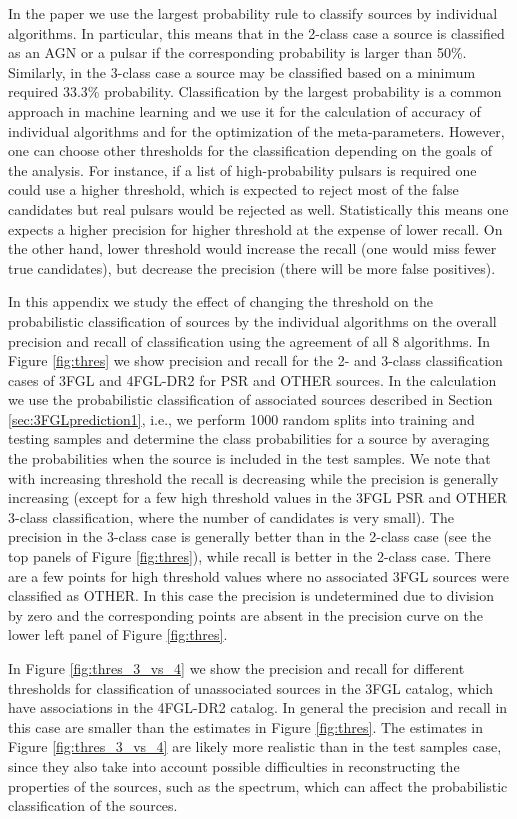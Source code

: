 In the paper we use the largest probability rule to classify sources by individual algorithms.
In particular, this means that in the 2-class case a source is classified as an AGN or a pulsar if the corresponding probability
is larger than 50\%. Similarly, in the 3-class case a source may be classified based on a minimum required 33.3\% probability.
Classification by the largest probability is a common approach in machine learning and we use it
for the calculation of accuracy of individual algorithms and for the optimization of the meta-parameters. 
However, one can choose other thresholds for the classification depending on the goals of the analysis.
For instance, if a list of high-probability pulsars is required one could use a higher threshold, 
which is expected to reject most of the false candidates but real pulsars would be rejected as well. 
Statistically this means one expects a higher precision for higher threshold
at the expense of lower recall.
On the other hand, lower threshold would increase the recall (one would miss fewer true candidates), 
but decrease the precision (there will be more false positives).



In this appendix we study the effect of changing the threshold on the probabilistic classification of sources by the individual
algorithms on the overall precision and recall of classification using the agreement of all 8 algorithms.
In Figure \ref{fig:thres} we show precision and recall for the 2- and 3-class classification cases of 3FGL and 4FGL-DR2 for PSR and OTHER sources.
In the calculation we use the probabilistic classification of associated sources described in Section \ref{sec:3FGLprediction1},
i.e., we perform 1000 random splits into training and testing samples and determine the class probabilities for a source by averaging the probabilities when the source is included in the test samples.
We note that with increasing threshold the recall is decreasing while the precision is generally increasing  (except for a few high threshold values in the 3FGL PSR and OTHER 3-class classification, where the number of candidates is very small).
The precision in the 3-class case is generally better than in the 2-class case (see the top panels of Figure \ref{fig:thres}),
while recall is better in the 2-class case.
There are a few points for high threshold values where no associated 3FGL sources were classified as OTHER.
In this case the precision is undetermined due to division by zero and the corresponding points are absent in the precision curve
on the lower left panel of Figure \ref{fig:thres}.


In Figure \ref{fig:thres_3_vs_4} we show the precision and recall for different thresholds for classification of unassociated sources in the 3FGL catalog, which have associations in the 4FGL-DR2 catalog. In general the precision and recall in this case are smaller than the estimates in Figure \ref{fig:thres}.  The estimates in Figure \ref{fig:thres_3_vs_4} are likely more realistic than in the test samples case, since they also take into account possible difficulties in reconstructing the properties of the sources, such as the spectrum, which can affect the probabilistic classification of the sources.




